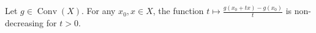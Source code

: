 Let $g \in \operatorname{Conv}(X)$. For any $x_0, x \in X$, the function $t \mapsto \frac{g(x_0 + tx) - g(x_0)}{t}$ is non-decreasing for $t > 0$.